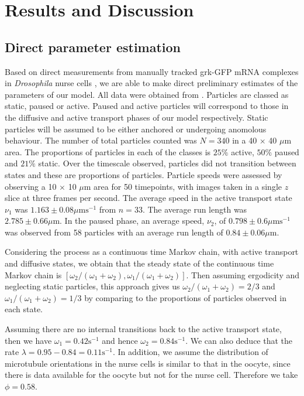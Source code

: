 \documentclass[twocolumn]{biophys}
\begin{document}
\section{Results and Discussion} \label{Results}

\subsection{Direct parameter estimation}
Based on direct measurements from manually tracked grk-GFP mRNA complexes in \textit{Drosophila} nurse cells \citep{neuman1996drosophila}, we are able to make direct preliminary estimates of the parameters of our model.
All data were obtained from \citet{DavidsonPhD2015}.
Particles are classed as static, paused or active.
Paused and active particles will correspond to those in the diffusive and active transport phases of our model respectively. 
Static particles will be assumed to be either anchored or undergoing anomolous behaviour. 
The number of total particles counted was $N=340$ in a 40 $\times$ 40 $\mu \text{m}$ area.
The proportions of particles in each of the classes is $25\%$ active, $50\%$ paused and $21\%$ static. 
Over the timescale observed, particles did not transition between states and these are proportions of particles. 
Particle speeds were assessed by observing a 10 $\times$ 10 $\mu \text{m}$ area for 50 timepoints, with images taken in a single $z$ slice at three frames per second. 
The average speed in the active transport state $\nu_1 $ was  $1.163 \pm 0.08 \mu \text{ms}^{-1}$ from $n=33$. 
The average run length was $2.785 \pm 0.66 \mu \text{m}$. 
In the paused phase, an average speed, $\nu_2$, of $0.798 \pm 0.6 \mu \text{ms}^{-1}$ was observed from 58 particles with an average run length of  $0.84 \pm 0.06 \mu \text{m}$. 

Considering the process as a continuous time Markov chain, with active transport and diffusive states, we obtain that the steady state of the continuous time Markov chain is $[\omega_2 /(\omega_1 + \omega_2), \omega_1/(\omega_1+\omega_2)]$. 
Then assuming ergodicity and neglecting static particles, this approach gives us $\omega_2 /(\omega_1 + \omega_2) = 2/3$ and $\omega_1 /(\omega_1 + \omega_2) = 1/3$ by comparing to the proportions of particles observed in each state.

Assuming there are no internal transitions back to the active transport state, then we have $\omega_1 = 0.42 \text{s}^{-1}$ and hence $\omega_2 = 0.84 \text{s}^{-1}$. 
We can also deduce that the rate $\lambda = 0.95-0.84 = 0.11 \text{s}^{-1}$.  
In addition, we assume the distribution of microtubule orientations in the nurse cells is similar to that in the oocyte, since there is data available for the oocyte \citep{parton20111} but not for the nurse cell. 
Therefore we take $\phi = 0.58$.
\end{document}
